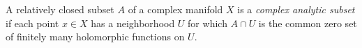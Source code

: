 
A relatively closed subset $A$ of a complex manifold $X$ is a \emph{complex analytic subset} if each point $x\in X$ has a neighborhood $U$ for which $A\cap U$ is the common zero set of finitely many holomorphic functions on $U$.
